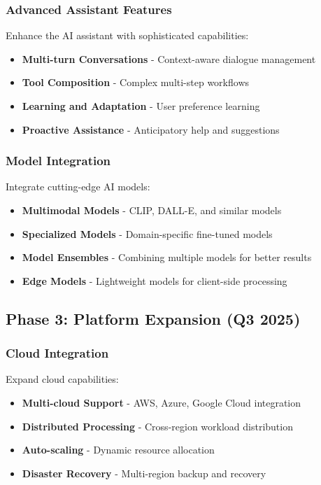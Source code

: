 \documentclass[11pt]{article}
\begin{document}
\subsubsection{Advanced Assistant Features}

Enhance the AI assistant with sophisticated capabilities:

\begin{itemize}
\item \textbf{Multi-turn Conversations} - Context-aware dialogue management
\item \textbf{Tool Composition} - Complex multi-step workflows
\item \textbf{Learning and Adaptation} - User preference learning
\item \textbf{Proactive Assistance} - Anticipatory help and suggestions
\end{itemize}

\subsubsection{Model Integration}

Integrate cutting-edge AI models:

\begin{itemize}
\item \textbf{Multimodal Models} - CLIP, DALL-E, and similar models
\item \textbf{Specialized Models} - Domain-specific fine-tuned models
\item \textbf{Model Ensembles} - Combining multiple models for better results
\item \textbf{Edge Models} - Lightweight models for client-side processing
\end{itemize}

\subsection{Phase 3: Platform Expansion (Q3 2025)}

\subsubsection{Cloud Integration}

Expand cloud capabilities:

\begin{itemize}
\item \textbf{Multi-cloud Support} - AWS, Azure, Google Cloud integration
\item \textbf{Distributed Processing} - Cross-region workload distribution
\item \textbf{Auto-scaling} - Dynamic resource allocation
\item \textbf{Disaster Recovery} - Multi-region backup and recovery
\end{itemize}
\end{document}
